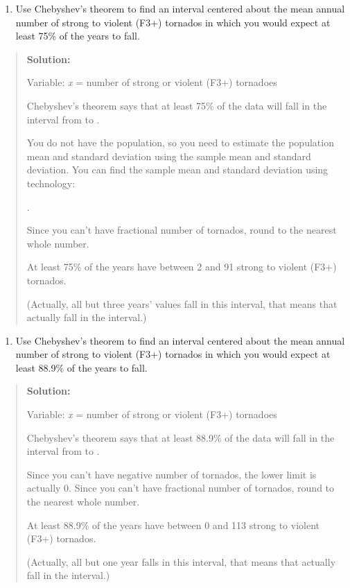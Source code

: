 \documentclass[]{book}
\providecommand{\tightlist}{%
  \setlength{\itemsep}{0pt}\setlength{\parskip}{0pt}}
\begin{document}
\begin{enumerate}
\def\labelenumi{\alph{enumi}.}
\tightlist
\item
  Use Chebyshev's theorem to find an interval centered about the mean
  annual number of strong to violent (F3+) tornados in which you would
  expect at least 75\% of the years to fall.
\end{enumerate}

\begin{quote}
\textbf{Solution:}

Variable: \emph{x} = number of strong or violent (F3+) tornadoes

Chebyshev's theorem says that at least 75\% of the data will fall in
the interval from to .

You do not have the population, so you need to estimate the population
mean and standard deviation using the sample mean and standard
deviation. You can find the sample mean and standard deviation using
technology:

.

Since you can't have fractional number of tornados, round to the
nearest whole number.

At least 75\% of the years have between 2 and 91 strong to violent
(F3+) tornados.

(Actually, all but three years' values fall in this interval, that
means that actually fall in the interval.)
\end{quote}

\begin{enumerate}
\def\labelenumi{\alph{enumi}.}
\setcounter{enumi}{1}
\tightlist
\item
  Use Chebyshev's theorem to find an interval centered about the mean
  annual number of strong to violent (F3+) tornados in which you would
  expect at least 88.9\% of the years to fall.
\end{enumerate}

\begin{quote}
\textbf{Solution:}

Variable: \emph{x} = number of strong or violent (F3+) tornadoes

Chebyshev's theorem says that at least 88.9\% of the data will fall in
the interval from to .

Since you can't have negative number of tornados, the lower limit is
actually 0. Since you can't have fractional number of tornados, round
to the nearest whole number.

At least 88.9\% of the years have between 0 and 113 strong to violent
(F3+) tornados.

(Actually, all but one year falls in this interval, that means that
actually fall in the interval.)
\end{quote}
\end{document}
